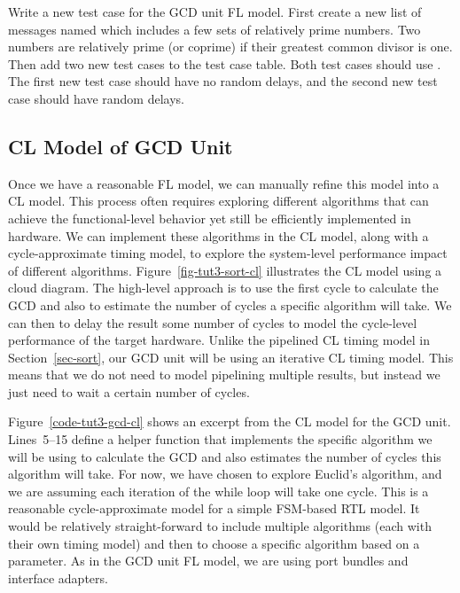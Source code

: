 \documentclass{cbxdoc}
\begin{document}
\begin{task}
  Write a new test case for the GCD unit FL model. First create a new
  list of messages named  which includes a few sets of
  relatively prime numbers. Two numbers are relatively prime (or coprime)
  if their greatest common divisor is one. Then add two new test cases to
  the test case table. Both test cases should use . The
  first new test case should have no random delays, and the second new
  test case should have random delays.
\end{task}

\subsection{CL Model of GCD Unit}



Once we have a reasonable FL model, we can manually refine this model
into a CL model. This process often requires exploring different
algorithms that can achieve the functional-level behavior yet still be
efficiently implemented in hardware. We can implement these algorithms in
the CL model, along with a cycle-approximate timing model, to explore the
system-level performance impact of different algorithms.
Figure~\ref{fig-tut3-sort-cl} illustrates the CL model using a cloud
diagram. The high-level approach is to use the first cycle to calculate
the GCD and also to estimate the number of cycles a specific algorithm
will take. We can then to delay the result some number of cycles to model
the cycle-level performance of the target hardware. Unlike the pipelined CL
timing model in Section~\ref{sec-sort}, our GCD unit will be using an
iterative CL timing model. This means that we do not need to model
pipelining multiple results, but instead we just need to wait a certain
number of cycles.



Figure~\ref{code-tut3-gcd-cl} shows an excerpt from the CL model for the
GCD unit. Lines~5--15 define a helper function that implements the
specific algorithm we will be using to calculate the GCD and also
estimates the number of cycles this algorithm will take. For now, we have
chosen to explore Euclid's algorithm, and we are assuming each iteration
of the while loop will take one cycle. This is a reasonable
cycle-approximate model for a simple FSM-based RTL model. It would be
relatively straight-forward to include multiple algorithms (each with
their own timing model) and then to choose a specific algorithm based on
a parameter. As in the GCD unit FL model, we are using port bundles and
interface adapters.
\end{document}
